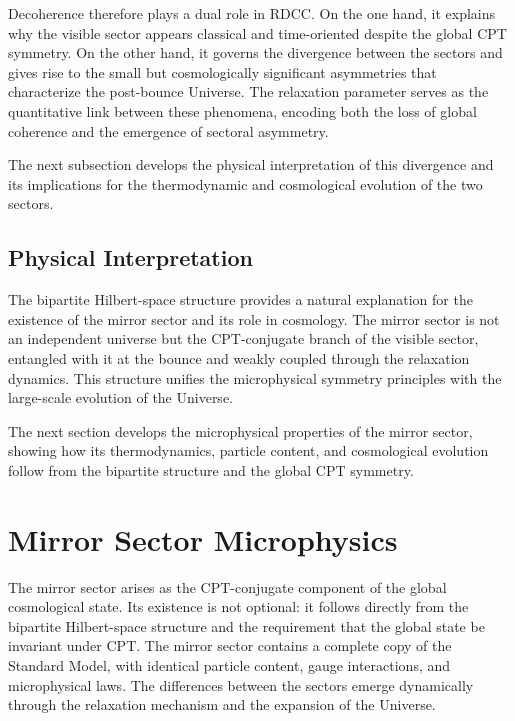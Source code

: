 \documentclass[11pt,a4paper]{article}
\begin{document}
Decoherence therefore plays a dual role in RDCC. On the one hand, it explains why the visible
sector appears classical and time-oriented despite the global CPT symmetry. On the other hand,
it governs the divergence between the sectors and gives rise to the small but cosmologically
significant asymmetries that characterize the post-bounce Universe. The relaxation parameter
serves as the quantitative link between these phenomena, encoding both the loss of global
coherence and the emergence of sectoral asymmetry.

The next subsection develops the physical interpretation of this divergence and its implications
for the thermodynamic and cosmological evolution of the two sectors.


\subsection{Physical Interpretation}

The bipartite Hilbert-space structure provides a natural explanation for the existence of the mirror sector and its role in cosmology. The mirror sector is not an independent universe but the CPT-conjugate branch of the visible sector, entangled with it at the bounce and weakly coupled through the relaxation dynamics. This structure unifies the microphysical symmetry principles with the large-scale evolution of the Universe.

The next section develops the microphysical properties of the mirror sector, showing how its thermodynamics, particle content, and cosmological evolution follow from the bipartite structure and the global CPT symmetry.

\section{Mirror Sector Microphysics}

The mirror sector arises as the CPT-conjugate component of the global cosmological state. Its existence is not optional: it follows directly from the bipartite Hilbert-space structure and the requirement that the global state be invariant under CPT. The mirror sector contains a complete copy of the Standard Model, with identical particle content, gauge interactions, and microphysical laws. The differences between the sectors emerge dynamically through the relaxation mechanism and the expansion of the Universe.
\end{document}
